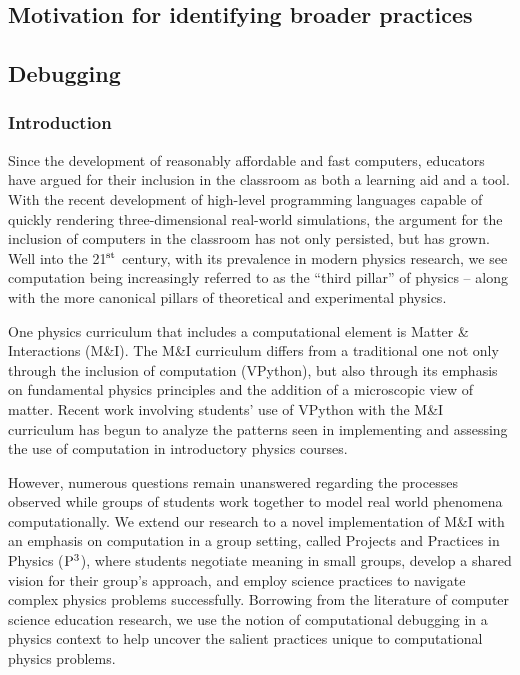 \documentclass{msuphddissertation}
\begin{document}
\begin{doublespace}
%
%

\chapter{Motivation for identifying broader practices}

\section{Debugging}

\subsection{Introduction}

Since the development of reasonably affordable and fast computers, educators have argued for their inclusion in the classroom as both a learning aid and a tool.\cite{DiSess1986,Shecker1993}  With the recent development of high-level programming languages capable of quickly rendering three-dimensional real-world simulations, the argument for the inclusion of computers in the classroom has not only persisted, but has grown.\cite{Chonacky2008}  Well into the 21$^{\rm st}$ century, with its prevalence in modern physics research, we see computation being increasingly referred to as the ``third pillar'' of physics -- along with the more canonical pillars of theoretical and experimental physics.\cite{Chabay2008}

One physics curriculum that includes a computational element is Matter \& Interactions (M\&I).  The M\&I curriculum differs from a traditional one not only through the inclusion of computation (VPython), but also through its emphasis on fundamental physics principles and the addition of a microscopic view of matter.\cite{Chabay2004,Chabay1999}  Recent work\cite{Kohlmyer2005,Caballero2012} involving students' use of VPython with the M\&I curriculum has begun to analyze the patterns seen in implementing and assessing the use of computation in introductory physics courses.

However, numerous questions remain unanswered regarding the processes observed while groups of students work together to model real world phenomena computationally.  We extend our research to a novel implementation of M\&I with an emphasis on computation in a group setting, called Projects and Practices in Physics (${\rm P}^{3}$), where students negotiate meaning in small groups, develop a shared vision for their group's approach, and employ science practices to navigate complex physics problems successfully.  Borrowing from the literature of computer science education research,\cite{McCauley2008} we use the notion of computational debugging in a physics context to help uncover the salient practices unique to computational physics problems.


\end{doublespace}
\end{document}
